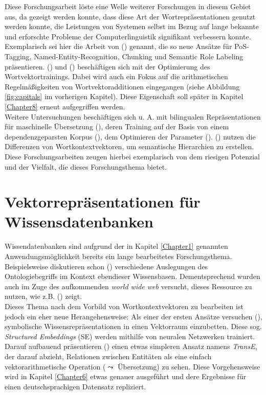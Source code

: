 Diese Forschungsarbeit löste eine Welle weiterer Forschungen in diesem Gebiet aus, da gezeigt werden konnte, dass diese
Art der Wortrepräsentationen genutzt werden konnte, die Leistungen von Systemen selbst im Bezug auf lange bekannte und
erforschte Probleme der Computerlinguistik signifikant verbessern konnte. Exemplarisch sei hier die Arbeit von
(\cite{collobert2011natural}) genannt, die so neue Ansätze für PoS-Tagging, Named-Entity-Recognition, Chunking und Semantic
Role Labeling präsentieren. (\cite{mikolov2013efficient}) und (\cite{mikolov2013distributed}) beschäftigen sich mit der
Optimierung des Wortvektortrainings. Dabei wird auch ein Fokus auf die arithmetischen Regelmäßigkeiten von Wortvektoradditionen
eingegangen (siehe Abbildung \ref{fig:capitals} im vorherigen Kapitel). Diese Eigenschaft soll später in Kapitel \ref{Chapter8} erneut
aufgegriffen werden.\\

Weitere Untersuchungen beschäftigen sich u. A. mit bilingualen Repräsentationen für maschinelle Übersetzung (\cite{zou2013bilingual}),
deren Training auf der Basis von einem dependenzgeparsten Korpus (\cite{levy2014dependency}), dem Optimieren der Parameter
(\cite{levy2015improving}). (\cite{fu2014learning}) nutzen die Differenzen von Wortkontextvektoren, um semantische
Hierarchien zu erstellen.\\
Diese Forschungsarbeiten zeugen hierbei exemplarisch von dem riesigen Potenzial und der Vielfalt, die dieses
Forschungsthema bietet.

\section{Vektorrepräsentationen für Wissensdatenbanken}

Wissendatenbanken sind aufgrund der in Kapitel \ref{Chapter1} genannten Anwendungsmöglichkeit bereits ein lange bearbeitetes
Forschungsthema. Beispielsweise diskutieren schon (\cite{giaretta1995ontologies}) verschiedene Auslegungen des Ontologiebegriffs
im Kontext ebendieser Wissensbasen. Dementsprechend wurden auch im Zuge des aufkommenden \emph{world wide web} versucht, dieses
Ressource zu nutzen, wie z.B. (\cite{craven2000learning}) zeigt.\\
Dieses Thema nach dem Vorbild von Wortkontextvektoren zu bearbeiten ist jedoch ein eher neue Herangehensweise: Als
einer der ersten Ansätze versuchen (\cite{bordes2011learning}), symbolische Wissensrepräsentationen in einen Vektorraum
einzubetten. Diese sog. \emph{Structured Embeddings} (SE) werden mithilfe von neuralen Netzwerken trainiert.
Darauf aufbauend präsentieren (\cite{bordes2013translating}) einen etwas simpleren Ansatz namens \emph{TransE}, der darauf abzieht, Relationen
zwischen Entitäten als eine einfach vektorarithmetische Operation ($\leadsto$ Übersetzung) zu sehen. Diese Vorgehensweise wird in Kapitel \ref{Chapter6}
etwas genauer ausgeführt und dere Ergebnisse für einen deutschsprachigen Datensatz repliziert.\\


